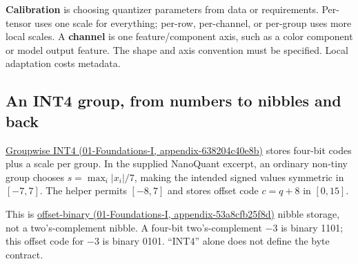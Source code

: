 \textbf{Calibration} is choosing quantizer parameters from data or requirements. Per-tensor uses one scale for everything; per-row, per-channel, or per-group uses more local scales. A \textbf{channel} is one feature/component axis, such as a color component or model output feature. The shape and axis convention must be specified. Local adaptation costs metadata.

\subsection{An INT4 group, from numbers to nibbles and back}\label{05-engine-i-ch001-an-int4-group-from-numbers-to-nibbles-and-back}

\href{../01-Foundations-I/main.pdf\#nameddest=appendix-638204c40e8b}{Groupwise INT4 (01-Foundations-I, appendix-638204c40e8b)} stores four-bit codes plus a scale per group. In the supplied NanoQuant excerpt, an ordinary non-tiny group chooses \(s=\max_i|x_i|/7\), making the intended signed values symmetric in \([-7,7]\). The helper permits \([-8,7]\) and stores offset code \(c=q+8\) in \([0,15]\).

This is \href{../01-Foundations-I/main.pdf\#nameddest=appendix-53a8cfb25f8d}{offset-binary (01-Foundations-I, appendix-53a8cfb25f8d)} nibble storage, not a two's-complement nibble. A four-bit two's-complement −3 is binary 1101; this offset code for −3 is binary 0101. ``INT4'' alone does not define the byte contract.

